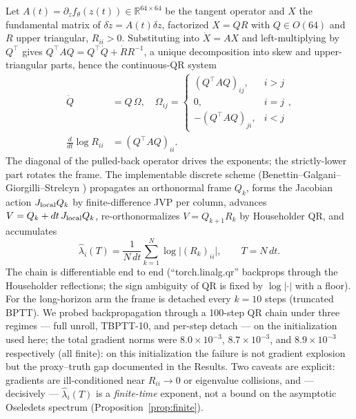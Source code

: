 \documentclass[journal]{IEEEtran}
\newcommand{\R}{\mathbb{R}}
\begin{document}
Let $A(t)=\partial_z f_\theta(z(t))\in\R^{64\times64}$ be the tangent
operator and $X$ the fundamental matrix of $\delta\dot z=A(t)\delta z$,
factorized $X=QR$ with $Q\in O(64)$ and $R$ upper triangular,
$R_{ii}>0$. Substituting into $\dot X=AX$ and left-multiplying by
$Q^\top$ gives $Q^\top A Q = Q^\top\dot Q + \dot R R^{-1}$, a unique
decomposition into skew and upper-triangular parts, hence the
continuous-QR system
\begin{equation}
\begin{split}
  \dot Q&=Q\,\Omega,\quad \Omega_{ij}=
    \begin{cases}(Q^\top A Q)_{ij},& i>j\\0,& i=j\\-(Q^\top A Q)_{ji},& i<j\end{cases},\\
  \frac{d}{dt}\log R_{ii}&=(Q^\top A Q)_{ii}.
\end{split}
\end{equation}
The diagonal of the pulled-back operator drives the exponents; the
strictly-lower part rotates the frame. The implementable discrete
scheme (Benettin--Galgani--Giorgilli--Strelcyn \cite{benettin1980lyapunov})
propagates an orthonormal frame $Q_k$, forms the Jacobian action
$J_{\rm local}Q_k$ by finite-difference JVP per column, advances
$V=Q_k+dt\,J_{\rm local}Q_k$, re-orthonormalizes $V=Q_{k+1}R_k$ by
Householder QR, and accumulates
\begin{equation}
  \hat\lambda_i(T)=\frac{1}{N\,dt}\sum_{k=1}^{N}\log\big|(R_k)_{ii}\big|,
  \qquad T=N\,dt.
\end{equation}
The chain is differentiable end to end (``torch.linalg.qr'' backprops
through the Householder reflections; the sign ambiguity of QR is fixed by
$\log|\cdot|$ with a floor). For the long-horizon arm the frame is
detached every $k=10$ steps (truncated BPTT). We probed backpropagation
through a 100-step QR chain under three regimes --- full unroll,
TBPTT-10, and per-step detach --- on the initialization used here; the
total gradient norms were $8.0\times10^{-3}$, $8.7\times10^{-3}$, and
$8.9\times10^{-3}$ respectively (all finite): on this initialization the
failure is not gradient explosion but the proxy--truth gap documented in
the Results. Two caveats are explicit: gradients are ill-conditioned
near $R_{ii}\to0$ or eigenvalue collisions, and --- decisively ---
$\hat\lambda_i(T)$ is a \emph{finite-time} exponent, not a bound on the
asymptotic Oseledets spectrum (Proposition~\ref{prop:finite}).
\end{document}
